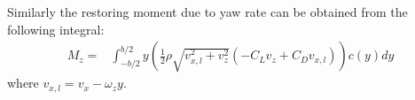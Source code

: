 Similarly the restoring moment due to yaw rate can be obtained from the following integral:
\begin{equation}\begin{split}
    M_z = 
    & \int_{-b/2}^{b/2} y \left( \frac{1}{2} \rho \sqrt{v_{x,l}^2 + v_z^2} \left( -C_L v_z + C_D v_{x,l} \right) \right) c(y) dy
\end{split}\end{equation}
where $v_{x,l} = v_x - \omega_z y$.

